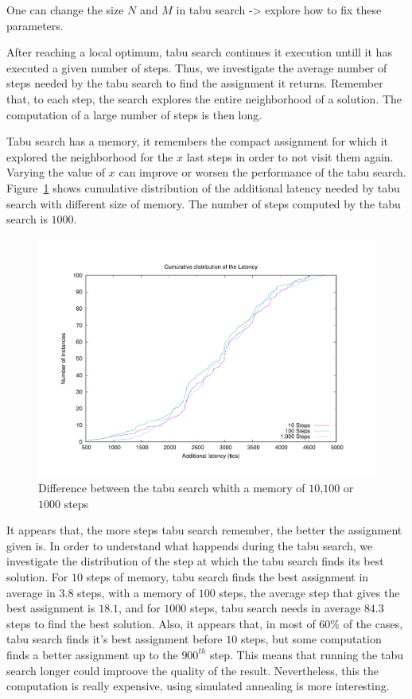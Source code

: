 \documentclass[english]{article}
\begin{document}
One can change the size $N$ and $M$ in tabu search -> explore how to fix these parameters. 

After reaching a local optimum, tabu search continues it execution untill it has executed a given number of steps.
Thus, we investigate the average number of steps needed by the tabu search to find the assignment it returns. Remember that, to each step, the search explores the entire neighborhood of a solution. The computation of a large number of steps is then long.

Tabu search has a memory, it remembers the compact assignment for which it explored the neighborhood for the $x$ last steps in order to not visit them again. Varying the value of $x$ can improve or worsen the performance of the tabu search.
Figure~\ref{fig:tabudistrib} shows cumulative distribution of the additional latency needed by tabu search with different size of memory. The number of steps computed by the tabu search is $1000$.
\begin{figure}[h]
	\centering
	\includegraphics[scale=0.3]{taboo_distrib}
\caption{ Difference between the tabu search whith a memory of $10$,$100$ or $1000$ steps}
\label{fig:tabudistrib}
\end{figure}
It appears that, the more steps tabu search remember, the better the assignment given is.
In order to understand what happends during the tabu search, we investigate the distribution of the step at which the tabu search finds its best solution.
For $10$ steps of memory, tabu search finds the best assignment in average in $3.8$ steps, with a memory of $100$ steps, the average step that gives the best assignment is $18.1$, and for $1000$ steps, tabu search needs in average $84.3$ steps to find the best solution. 
Also, it appears that, in most of $60\%$ of the cases, tabu search finds it's best assignment before $10$ steps, but some computation finds a better assignment up to the $900^{th}$ step. This means that running the tabu search longer could improove the quality of the result. Nevertheless, this the computation is really expensive, using simulated annealing is more interesting.
\end{document}

